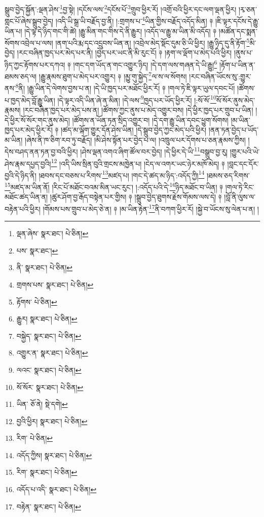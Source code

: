 སྒྲུབ་བྱེད་སྐྱོན་:ལྡན་ཤེས་\footnote{ལྡན་ཞེས་  སྣར་ཐང་།  པེ་ཅིན། }བྱ་སྟེ། །དངོས་ལས་\footnote{པས་  སྣར་ཐང་། }དངོས་པོ་\footnote{ནི་  སྣར་ཐང་།  པེ་ཅིན། }གྲུབ་ཕྱིར་རོ། །འགྲོ་བའི་ཕྱིར་དང་ལག་ལྡན་ཕྱིར། །རྭ་ཅན་གླང་པོ་ཞེས་སྒྲུབ་བྱེད། །འདི་ཡི་སྒྲ་ཡི་བརྗོད་བྱ་ནི། །:གྲགས་པ་\footnote{གྲགས་པས་  སྣར་ཐང་།  པེ་ཅིན། }ཡིན་གྱིས་བརྗོད་འདོད་མིན། ༈ །ཇི་ལྟར་དངོས་དེ་རྒྱུ་ཡིན་པ། །དེ་ལྟ་དེ་ཉིད་གང་གི་ཚེ། །རྒྱུ་མིན་གང་གིས་དེ་ནི་རྒྱུར། །འདོད་ལ་རྒྱུ་མ་ཡིན་མི་འདོད། ༈ །མཚོན་དང་སྨན་སོགས་འབྲེལ་པ་ལས། །ནག་པའི་རྨ་དང་འདྲུབས་ཡིན་ན། །འབྲེལ་མེད་སྡོང་དུམ་ཅི་ཡི་ཕྱིར། །རྒྱུ་ཉིད་དུ་ནི་རྟོག་\footnote{རྟོགས་  པེ་ཅིན། }མི་བྱེད། །རང་བཞིན་ཁྱད་པར་མེད་པར་ནི། །བྱེད་པར་ཡང་ནི་མི་རུང་ངོ། ༈ །རྟག་ལ་ལྡོག་པ་མེད་པའི་ཕྱིར། །ནུས་པ་ཉིད་ཀྱང་རྟོགས་པར་དཀའ། ༈ །གང་དག་ཡོད་ན་གང་འགྱུར་ཉིད། །དེ་དག་ལས་གཞན་དེ་ཡི་རྒྱུ།\footnote{རྒྱུར།  སྣར་ཐང་།  པེ་ཅིན། } །རྟོག་པ་ཡིན་ན་ཐམས་ཅད་ལ། །རྒྱུ་རྣམས་ཐུག་པ་མེད་པར་འགྱུར། ༈ །མྱུ་གུ་སྐྱེད་\footnote{བསྐྱེད་  སྣར་ཐང་།  པེ་ཅིན། }ལ་ས་ལ་སོགས། །རང་བཞིན་ཡོངས་སུ་:གྱུར་ནས་\footnote{འགྱུར་ན་  སྣར་ཐང་།  པེ་ཅིན། }ནི། །རྒྱུ་ཡིན་དེ་ལེགས་བྱས་པ་ན། །དེ་ཡི་ཁྱད་པར་མཐོང་ཕྱིར་རོ། ༈ །གལ་ཏེ་ཇི་ལྟར་ཡུལ་དབང་པོ། །ཚོགས་པ་ཁྱད་མེད་བློ་རྒྱུ་ཡིན། །དེ་ལྟར་འདི་ཡིན་ཞེ་ན་མིན། །དེ་ལས་\footnote{ལའང་  སྣར་ཐང་།  པེ་ཅིན། }ཁྱད་པར་ཡོད་ཕྱིར་རོ། །:སོ་སོ་\footnote{སོ་སོར་  སྣར་ཐང་།  པེ་ཅིན། }སོ་སོར་ནུས་མེད་རྣམས། །རང་བཞིན་ཁྱད་པར་མེད་པས་ན། །ཚོགས་ཀྱང་ནུས་པ་མེད་འགྱུར་བས། །དེ་ཕྱིར་ཁྱད་པར་གྲུབ་པ་ཡིན། །དེ་ཕྱིར་སོ་སོར་གང་ནུས་མེད། །ཚོགས་ན་ཡོན་ཏན་སྲིད་འགྱུར་བ། །དེ་དག་རྒྱུ་ཡིན་དབང་ཕྱུག་སོགས། །མ་ཡིན་ཁྱད་པར་མེད་ཕྱིར་རོ། ༈ །ཚད་མ་ལྐོག་གྱུར་དོན་ཤེས་ཡིན། །དེ་སྒྲུབ་བྱེད་ཀྱང་མེད་པའི་ཕྱིར། །ནན་ཏན་བྱེད་པ་ཡོད་མ་ཡིན། །ཞེས་ནི་ཁ་ཅིག་རབ་ཏུ་བརྗོད། །མི་ཤེས་སྟོན་པར་བྱེད་པ་ལ། །འཁྲུལ་པར་དོགས་པ་ཅན་རྣམས་ཀྱིས། །དེས་བཤད་ནན་ཏན་བྱ་བའི་ཕྱིར། །ཤེས་ལྡན་འགའ་ཞིག་ཚོལ་བར་བྱེད། །དེ་ཕྱིར་དེ་ཡི་\footnote{ཡིན་  ཅོ་ནེ།  སྡེ་དགེ། }བསྒྲུབ་བྱ་རུ། །གྱུར་པའི་ཡེ་ཤེས་རྣམ་དཔྱད་བྱའི།\footnote{བྱའི་ཕྱིར།  སྣར་ཐང་།  པེ་ཅིན། } །འདི་ཡིས་སྲིན་བུའི་གྲངས་མཁྱེན་པ། །ངེད་ལ་འགར་ཡང་ཉེར་མཁོ་མེད། ༈ །བླང་དང་དོར་བྱའི་དེ་ཉིད་ནི། །ཐབས་དང་བཅས་པ་རིགས་\footnote{རིག་  པེ་ཅིན། }མཛད་པ། །གང་དེ་ཚད་མ་ཉིད་:འདོད་ཀྱི།\footnote{འདོད་ཀྱིས།  སྣར་ཐང་།  པེ་ཅིན། } །ཐམས་ཅད་རིགས་\footnote{རིག་  སྣར་ཐང་།  པེ་ཅིན། }མཛད་མ་ཡིན་ནོ། །རིང་པོ་མཐོང་བའམ་མིན་ཡང་རུང་། །:འདོད་པའི་དེ་\footnote{འདོད་པ་འདི་  སྣར་ཐང་།  པེ་ཅིན། }ཉིད་མཐོང་བ་ཡིན། ༈ །གལ་ཏེ་རིང་མཐོང་ཚད་ཡིན་ན། །ཚུར་ཤོག་བྱ་རྒོད་བསྟེན་པར་གྱིས། ༈ །སྒྲུབ་བྱེད་ཐུགས་རྗེས་གོམས་ལས་དེ། ༈ །བློ་ནི་ལུས་ལ་བརྟེན་པའི་ཕྱིར། །གོམས་པས་གྲུབ་པ་མེད་ཅེ་ན། ༈ །མ་ཡིན་རྟེན་\footnote{བརྟེན་  སྣར་ཐང་།  པེ་ཅིན། }ནི་བཀག་ཕྱིར་རོ། །སྐྱེ་བ་ཡོངས་སུ་ལེན་པ་ན། །
